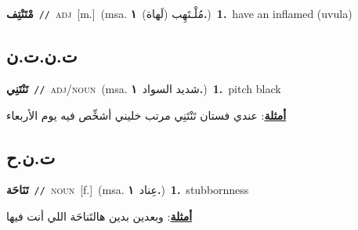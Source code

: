 \documentclass[10pt,a4paper,twoside]{article} %
\begin{document}
\begin{multicols}{2}
{\setlength\topsep{0pt}\textbf{\foreignlanguage{arabic}{مْتَنْتِف}}\ {\color{gray}\texttt{//}\color{black}}\ \textsc{adj}\ [m.]\ \color{gray}(msa. \foreignlanguage{arabic}{مُلْـتَهِب (لَهاة)}~\foreignlanguage{arabic}{\textbf{١.}})\color{black}\ \textbf{1.}~have an inflamed (uvula)\ } \vspace{2mm}

\vspace{-3mm}
\subsection*{\color{blue}\foreignlanguage{arabic}{ت.ن.ت.ن}\color{blue}{}} 

{\setlength\topsep{0pt}\textbf{\foreignlanguage{arabic}{تَنْتَنِي}}\ {\color{gray}\texttt{//}\color{black}}\ \textsc{adj/noun}\ \color{gray}(msa. \foreignlanguage{arabic}{شديد السواد}~\foreignlanguage{arabic}{\textbf{١.}})\color{black}\ \textbf{1.}~pitch black\  \begin{flushright}\color{gray}\foreignlanguage{arabic}{\textbf{\underline{\foreignlanguage{arabic}{أمثلة}}}: عندي فستان تَنْتَنِي مرتب خليني أشخِّص فيه يوم الأربعاء}\end{flushright}\color{black}} \vspace{2mm}

\vspace{-3mm}
\subsection*{\color{blue}\foreignlanguage{arabic}{ت.ن.ح}\color{blue}{}} 

{\setlength\topsep{0pt}\textbf{\foreignlanguage{arabic}{تَنَاحَة}}\ {\color{gray}\texttt{//}\color{black}}\ \textsc{noun}\ [f.]\ \color{gray}(msa. \foreignlanguage{arabic}{عِناد}~\foreignlanguage{arabic}{\textbf{١.}})\color{black}\ \textbf{1.}~stubbornness\  \begin{flushright}\color{gray}\foreignlanguage{arabic}{\textbf{\underline{\foreignlanguage{arabic}{أمثلة}}}: وبعدين بدين هالتَناحَة اللي أنت فيها}\end{flushright}\color{black}} \vspace{2mm}


\end{multicols}
\end{document}
